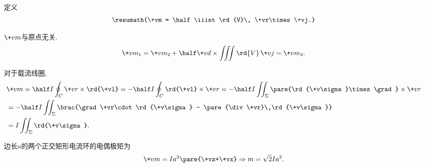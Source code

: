 \documentclass[hidelinks]{ctexart}
\begin{document}
定义
\[ \resumath{\+vm = \half \iiint \rd{V}\, \+vr\times \+vj.} \]
\begin{cenum}
    \item $\+vm$与原点无关.
    \[ \+vm_1 = \+vm_2 + \half \+vd\times \iiint \rd{V}\, \+vj = \+vm_2. \]
    \item 对于载流线圈,
    \begin{align*}
        &\+vm = \half I \oint_C \+vr\times \rd{\+vl} = -\half I\oint_C \rd{\+vl}\times \+vr = -\half I \iint_{\Sigma}\pare{\rd{\+v\sigma}\times \grad} \times \+vr \\
        &= -\half I \iint_{\Sigma} \brac{\grad\+vr\cdot \rd{\+v\sigma} - \pare{\div \+vr}\,\rd{\+v\sigma}} \\
        &= I\iint_{\Sigma} \rd{\+v\sigma}.
    \end{align*}
\end{cenum}
\begin{sample}
    \begin{ex}
        边长$a$的两个正交矩形电流环的电偶极矩为
        \[ \+vm = Ia^2\pare{\+vz+\+vx} \Rightarrow m = \sqrt{2}Ia^2. \]
    \end{ex}
\end{sample}
\end{document}
